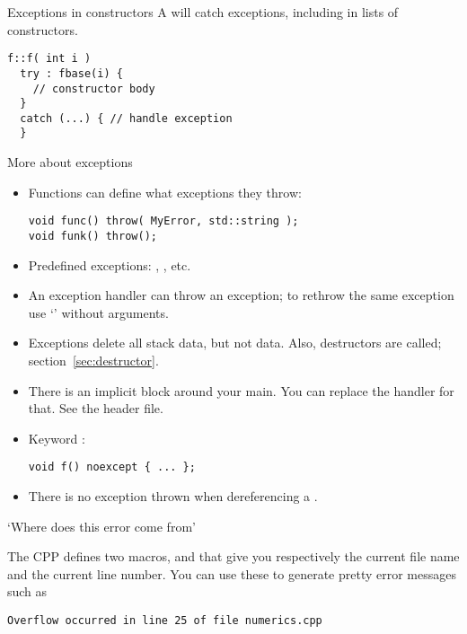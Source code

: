 \begin{block}{Exceptions in constructors}
  \label{sl:except-construct}
  A  will catch exceptions,
    including in  lists of constructors.
\begin{lstlisting}
f::f( int i ) 
  try : fbase(i) {
    // constructor body
  }
  catch (...) { // handle exception
  }
\end{lstlisting}
\end{block}

\begin{block}{More about exceptions}
  \label{sl:exception-more}
  \begin{itemize}
  \item Functions can define what exceptions they throw: 
\begin{lstlisting}
void func() throw( MyError, std::string );
void funk() throw();
\end{lstlisting}
\item Predefined exceptions: ,
  , etc.
\item An exception handler can throw an exception; to rethrow the same
  exception use `' without arguments.
\item Exceptions delete all stack data, but not  data. Also,
  destructors are called; section~\ref{sec:destructor}.
\item There is an implicit  block around your
  main. You can replace the handler for that. See the
   header file.
\item Keyword :
\begin{lstlisting}
void f() noexcept { ... };
\end{lstlisting}
\item There is no exception thrown when dereferencing a .
  \end{itemize}
\end{block}

 {`Where does this error come from'}

The \ac{CPP} defines two macros,  and
 that give you respectively the current file name
and the current line number. You can use these to generate pretty
error messages such as
\begin{verbatim}
Overflow occurred in line 25 of file numerics.cpp
\end{verbatim}

